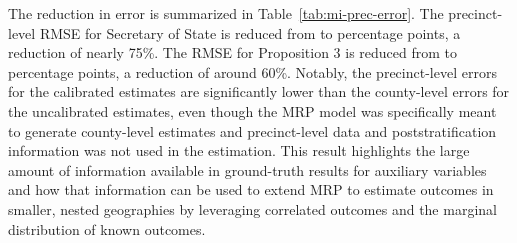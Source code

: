The reduction in error is summarized in Table~\ref{tab:mi-prec-error}. The precinct-level RMSE for Secretary of State is reduced from 
to
percentage points, a reduction of nearly 75\%.
The RMSE for Proposition 3 is reduced from 
to
percentage points, a reduction of around 60\%.
Notably, the precinct-level errors for the calibrated estimates are significantly lower than the county-level errors for the uncalibrated estimates, even though the MRP model was specifically meant to generate county-level estimates and precinct-level data and poststratification information was not used in the estimation. 
This result highlights the large amount of information available in ground-truth results for auxiliary variables and how that information can be used to extend MRP to estimate outcomes in smaller, nested geographies by leveraging correlated outcomes and the marginal distribution of known outcomes. 

